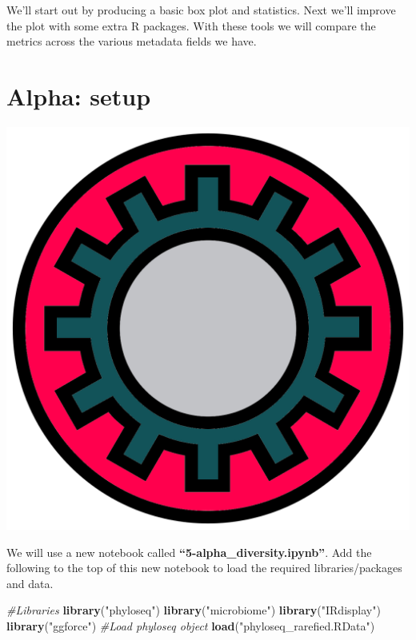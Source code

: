 \documentclass[
]{book}
\newenvironment{Shaded}{\begin{snugshade}}{\end{snugshade}}
\newcommand{\CommentTok}[1]{\textcolor[rgb]{0.56,0.35,0.01}{\textit{#1}}}
\newcommand{\FunctionTok}[1]{\textcolor[rgb]{0.13,0.29,0.53}{\textbf{#1}}}
\newcommand{\NormalTok}[1]{#1}
\newcommand{\StringTok}[1]{\textcolor[rgb]{0.31,0.60,0.02}{#1}}
\begin{document}
We'll start out by producing a basic box plot and statistics.
Next we'll improve the plot with some extra R packages.
With these tools we will compare the metrics across the various metadata fields we have.

\hypertarget{alpha-setup}{%
\section{Alpha: setup}\label{alpha-setup}}

\includegraphics{figures/gear_setup.png}

We will use a new notebook called \textbf{``5-alpha\_diversity.ipynb''}.
Add the following to the top of this new notebook to load the required libraries/packages and data.

\begin{Shaded}
\begin{Highlighting}[]
\CommentTok{\#Libraries}
\FunctionTok{library}\NormalTok{(}\StringTok{"phyloseq"}\NormalTok{)}
\FunctionTok{library}\NormalTok{(}\StringTok{"microbiome"}\NormalTok{)}
\FunctionTok{library}\NormalTok{(}\StringTok{"IRdisplay"}\NormalTok{)}
\FunctionTok{library}\NormalTok{(}\StringTok{"ggforce"}\NormalTok{)}
\CommentTok{\#Load phyloseq object}
\FunctionTok{load}\NormalTok{(}\StringTok{"phyloseq\_rarefied.RData"}\NormalTok{)}
\end{Highlighting}
\end{Shaded}
\end{document}
